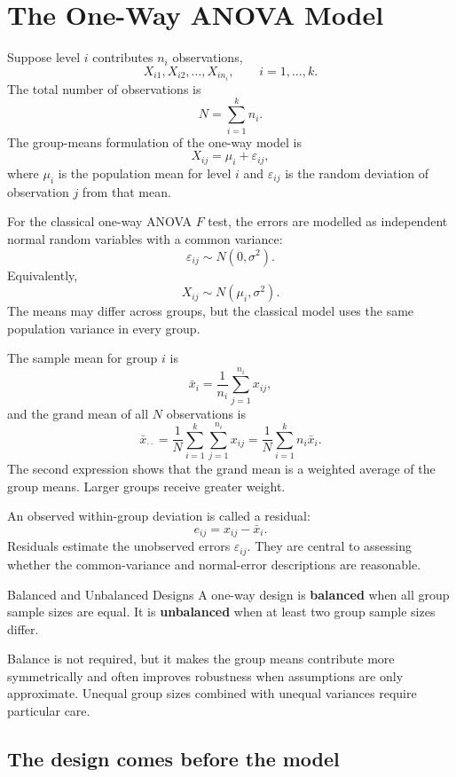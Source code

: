 \section{The One-Way ANOVA Model}
\label{sec:one-way-anova-model}

Suppose level $i$ contributes $n_i$ observations,
\[
X_{i1},X_{i2},\ldots,X_{in_i},
\qquad i=1,\ldots,k.
\]
The total number of observations is
\[
N=\sum_{i=1}^{k}n_i.
\]
The group-means formulation of the one-way model is
\[
X_{ij}=\mu_i+\varepsilon_{ij},
\]
where $\mu_i$ is the population mean for level $i$ and $\varepsilon_{ij}$ is the random deviation of observation $j$ from that mean.

For the classical one-way ANOVA $F$ test, the errors are modelled as independent normal random variables with a common variance:
\[
\varepsilon_{ij}\sim N(0,\sigma^2).
\]
Equivalently,
\[
X_{ij}\sim N(\mu_i,\sigma^2).
\]
The means may differ across groups, but the classical model uses the same population variance in every group.

The sample mean for group $i$ is
\[
\bar x_i=\frac{1}{n_i}\sum_{j=1}^{n_i}x_{ij},
\]
and the grand mean of all $N$ observations is
\[
\bar x_{\cdot\cdot}
=\frac{1}{N}\sum_{i=1}^{k}\sum_{j=1}^{n_i}x_{ij}
=\frac{1}{N}\sum_{i=1}^{k}n_i\bar x_i.
\]
The second expression shows that the grand mean is a weighted average of the group means. Larger groups receive greater weight.

An observed within-group deviation is called a residual:
\[
e_{ij}=x_{ij}-\bar x_i.
\]
Residuals estimate the unobserved errors $\varepsilon_{ij}$. They are central to assessing whether the common-variance and normal-error descriptions are reasonable.

\begin{definition}{Balanced and Unbalanced Designs}
A one-way design is \textbf{balanced} when all group sample sizes are equal. It is \textbf{unbalanced} when at least two group sample sizes differ.
\end{definition}

Balance is not required, but it makes the group means contribute more symmetrically and often improves robustness when assumptions are only approximate. Unequal group sizes combined with unequal variances require particular care.

\subsection{The design comes before the model}


